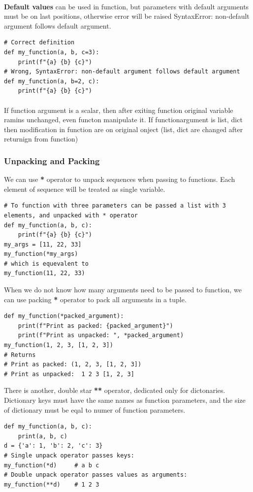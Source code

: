 \documentclass{article}
\begin{document}
	\paragraph{}
	\textbf{Default values} can be used in function, but parameters with default arguments must be on last positions, otherwise error will be raised \textcolor{pythonerror}{SyntaxError: non-default argument follows default argument}.
	\begin{lstlisting}[style=pystyle]
# Correct definition
def my_function(a, b, c=3):
	print(f"{a} {b} {c}")
# Wrong, SyntaxError: non-default argument follows default argument
def my_function(a, b=2, c):
	print(f"{a} {b} {c}")
	\end{lstlisting}
	
	\paragraph{}
	If function argument is a scalar, then after exiting function original variable ramins unchanged, even functon manipulate it. If functionargument is list, dict then modification in function are on original onject (list, dict are changed after returnign from function)
	
	\subsubsection{Unpacking and Packing}
	We can use \textbf{*} operator to unpack sequences when passing to functions. Each element of sequence will be treated as single variable.
	\begin{lstlisting}[style=pystyle]
# To function with three parameters can be passed a list with 3 elements, and unpacked with * operator
def my_function(a, b, c):
	print(f"{a} {b} {c}")
my_args = [11, 22, 33]
my_function(*my_args)
# which is equevalent to 
my_function(11, 22, 33)
	\end{lstlisting}
	
	When we do not know how many arguments need to be passed to function, we can use packing \textbf{*} operator to pack all arguments in a tuple.
	\begin{lstlisting}[style=pystyle]
def my_function(*packed_argument):
	print(f"Print as packed: {packed_argument}")
	print(f"Print as unpacked: ", *packed_argument)
my_function(1, 2, 3, [1, 2, 3])
# Returns
# Print as packed: (1, 2, 3, [1, 2, 3])
# Print as unpacked:  1 2 3 [1, 2, 3]
	\end{lstlisting}
	
	There is another, double star \textbf{**} operator, dedicated only for dictonaries. Dictionary keys must have the same names as function parameters, and the size of dictionary must be eqal to numer of function parameters.
\begin{lstlisting}[style=pystyle]
def my_function(a, b, c):
	print(a, b, c)
d = {'a': 1, 'b': 2, 'c': 3}
# Single unpack operator passes keys:
my_function(*d)		# a b c
# Double unpack operator passes values as arguments:
my_function(**d)	# 1 2 3
	\end{lstlisting}
	
\end{document}
